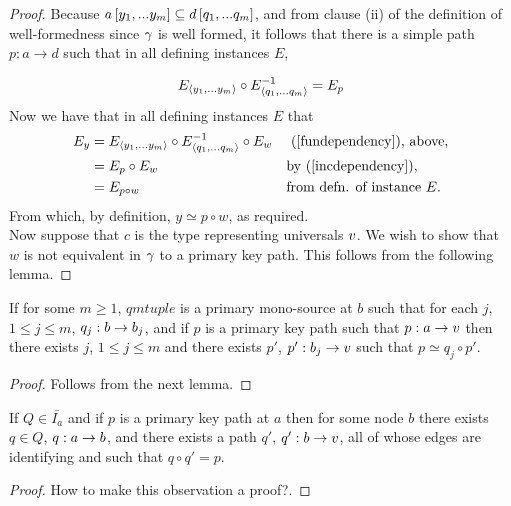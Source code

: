 \begin{proof}
Because $a\left[y_1,...y_m\right]\subseteq d\left[q_1,...q_m\right]$,  and from
clause (ii) of the definition of well-formedness since $\gamma$ is well formed, it follows that
there  is a simple path $p:a \rightarrow d$ such
that 
in all defining instances $E$,

\begin{equation}
\label{incdependency}
E_{\langle y_1,...y_m\rangle} \circ E^{-1}_{\langle q_1,...q_m\rangle} = E_p
\end{equation}
Now we have  that in all defining instances $E$ that 
\begin{align*}
E_y &= E_{\langle y_1,...y_m\rangle} \circ E_{\langle q_1,...q_m\rangle}^{-1} \circ E_w  && \text{ (\ref{fundependency}), above,}\\
    &= E_p \circ E_w                                   && \text{by (\ref{incdependency}),}\\
		&= E_{p \circ w}                                   && \text{from defn. of instance }E.\\
\end{align*} 
\vspace{-0.3cm}
From which, by definition, $y\simeq p \circ w$, as required. \\

Now suppose that $c$ is the type representing universals $v$.
We wish to show that $w$ is not equivalent in $\gamma$ to
a primary key path. This follows from the following lemma.
\end{proof}

\begin{lemma}
If for some $m \geq 1$, $qmtuple$ is a primary mono-source at $b$ such that for each $j$, $1 \leq j \leq m$, $q_j : b \rightarrow b_j$,
and if  $p$ is a primary key path such that $p: a \rightarrow v$   
then there exists $j$, $1 \leq j \leq m$ and there exists $p'$, $p': b_j \rightarrow v$ such that $p \simeq q_j \circ p'$.
\end{lemma}
\begin{proof}
Follows from the next lemma.
\end{proof}

\begin{lemma}
If $Q \in \bar{I_a}$ and if $p$ is a primary key path at $a$ then for some node $b$ there exists $q \in Q$, $q: a \rightarrow b$, and there exists 
a path $q'$, $q': b \rightarrow v$,  all of whose edges are identifying and such that $q \circ q' = p$. 
\end{lemma}
\begin{proof}
How to make this observation a proof?.
\end{proof}

